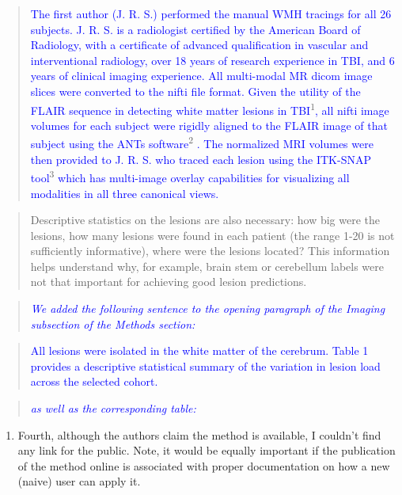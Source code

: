 \documentclass[12pt,]{article}
\providecommand{\tightlist}{%
  \setlength{\itemsep}{0pt}\setlength{\parskip}{0pt}}
\begin{document}
\begin{quote}
\textcolor{blue}{The first author (J. R. S.) performed the manual WMH tracings for all 26  subjects.  J. R. S. is a radiologist certified by the American Board of Radiology, with a certificate of advanced qualification in vascular and interventional radiology, over 18 years of research experience in TBI, and 6 years of clinical imaging experience.  All multi-modal MR dicom image slices were converted to the nifti file format. Given the utility of the FLAIR sequence in detecting white matter lesions in TBI}\textsuperscript{1}\textcolor{blue}{, all nifti image volumes for each subject were rigidly aligned to the FLAIR image of that subject using the ANTs software}\textsuperscript{2}
\textcolor{blue}{.  The normalized MRI volumes were then provided to J. R. S. who traced each lesion using the ITK-SNAP tool}\textsuperscript{3}
\textcolor{blue}{ which has multi-image overlay capabilities for visualizing all modalities in all three canonical views.}
\end{quote}

\begin{quote}
Descriptive statistics on the lesions are also necessary: how big were
the lesions, how many lesions were found in each patient (the range 1-20
is not sufficiently informative), where were the lesions located? This
information helps understand why, for example, brain stem or cerebellum
labels were not that important for achieving good lesion predictions.
\end{quote}

\begin{quote}
\emph{\textcolor{blue}{We added the following sentence to the opening paragraph of the
Imaging subsection of the Methods section:}}
\end{quote}

\begin{quote}
\textcolor{blue}{All lesions were isolated in the white matter of the cerebrum.
Table 1 provides a descriptive statistical summary of the variation in lesion load across the selected cohort.}
\end{quote}

\begin{quote}
\emph{\textcolor{blue}{as well as the corresponding table:}}
\end{quote}



\clearpage

\begin{enumerate}
\def\labelenumi{\arabic{enumi}.}
\setcounter{enumi}{3}
\tightlist
\item
  Fourth, although the authors claim the method is available, I couldn't
  find any link for the public. Note, it would be equally important if
  the publication of the method online is associated with proper
  documentation on how a new (naive) user can apply it.
\end{enumerate}
\end{document}
